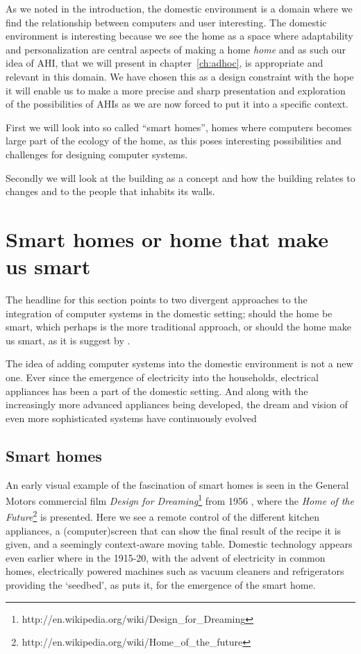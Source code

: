 As we noted in the introduction, the domestic environment is a domain where we find the relationship between computers and user interesting.
The domestic environment is interesting because we see the home as a space where adaptability and personalization are central aspects of making a home \emph{home} and as such our idea of AHI, that we will present in chapter~\ref{ch:adhoc}, is appropriate and relevant in this domain.
We have chosen this as a design constraint with the hope it will enable us to make a more precise and sharp presentation and exploration of the possibilities of AHIs as we are now forced to put it into a specific context.

First we will look into so called ``smart homes'', homes where computers becomes large part of the ecology of the home, as this poses interesting possibilities and challenges for designing computer systems.

Secondly we will look at the building as a concept and how the building relates to changes and to the people that inhabits its walls.

\section{Smart homes or home that make us smart}
The headline for this section points to two divergent approaches to the integration of computer systems in the domestic setting; should the home be smart, which perhaps is the more traditional approach, or should the home make us smart, as it is suggest by \citet{taylor2007homes}.

The idea of adding computer systems into the domestic environment is not a new one.
Ever since the emergence of electricity into the households, electrical appliances has been a part of the domestic setting.
And along with the increasingly more advanced appliances being developed, the dream and vision of even more sophisticated systems have continuously evolved

\subsection{Smart homes}
An early visual example of the fascination of smart homes is seen in the General Motors commercial film \emph{Design for Dreaming}\footnote{http://en.wikipedia.org/wiki/Design\_for\_Dreaming} from 1956 \citep{designfordreaming}, where the \emph{Home of the Future}\footnote{http://en.wikipedia.org/wiki/Home\_of\_the\_future} is presented.
Here we see a remote control of the different kitchen appliances, a (computer)screen that can show the final result of the recipe it is given, and a seemingly context-aware moving table.
Domestic technology appears even earlier where in the 1915-20, with the advent of electricity in common homes, electrically powered machines such as vacuum cleaners and refrigerators providing the `seedbed', as \citet{aldrich2003smart} puts it, for the emergence of the smart home.

